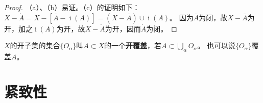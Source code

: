 \begin{proof}
	（a）、（b）易证。（c）的证明如下：
	$X - \dot{A} = X - [\bar{A} - \operatorname{i}(A)] = (X - \bar{A}) \cup \operatorname{i}(A)$。
	因为$\bar{A}$为闭，故$X - \bar{A}$为开，加之$\operatorname{i}(A)$为开，故$X - \dot{A}$为开，因而$\dot{A}$为闭。
\end{proof}

\begin{definition}
	$X$的开子集的集合$\{O_\alpha\}$叫$A \subset X$的一个\textbf{开覆盖}，若$A \subset \bigcup\limits_\alpha O_\alpha$。
	也可以说$\{O_\alpha\}$覆盖$A$。
\end{definition}

\section{紧致性}
